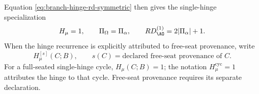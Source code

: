 Equation \eqref{eq:branch-hinge-rd-symmetric} then gives the single-hinge specialization
\begin{equation}
H_\mu=1,
\qquad
\Pi_\Omega=\Pi_\alpha,
\qquad
RD^{(1)}_{\AO}=2|\Pi_\alpha|+1.
\label{eq:single-hinge-symmetric-fixture}
\end{equation}
When the hinge recurrence is explicitly attributed to free-seat provenance, write
\begin{equation}
H_\mu^{[s]}(C;B),
\qquad
s(C)=\text{declared free-seat provenance of }C.
\label{eq:free-seat-hinge-provenance}
\end{equation}
For a full-seated single-hinge cycle, \(H_\mu(C;B)=1\); the
notation \(H_\mu^{\mathrm{cyc}}=1\) attributes the hinge to that cycle.
Free-seat provenance requires its separate declaration.
